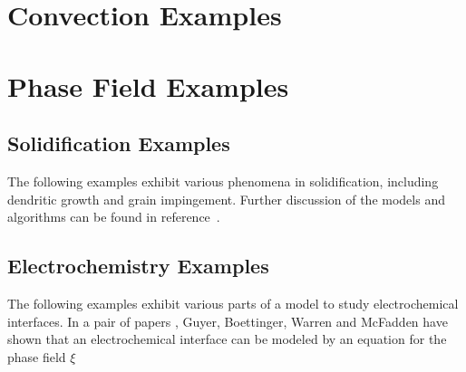 \documentclass[tocAsPDFpart]{fipy}
\begin{document}
\chapter{Convection Examples}


% 

% 
% 

\chapter{Phase Field Examples}

\section*{Solidification Examples}

The following examples exhibit various phenomena in solidification, including
dendritic growth and grain impingement.  Further discussion of the
models and algorithms can be found in
reference~\cite{WarrenPolycrystal}.






% 
% 
% 
\newpage

\section*{Electrochemistry Examples}

The following examples exhibit various parts of a model to study
electrochemical interfaces.  In a pair of papers
\cite{ElPhFI,ElPhFII}, Guyer, Boettinger, Warren and McFadden have
shown that an electrochemical interface can be modeled by an equation
for the phase field \( \xi \)
\end{document}
